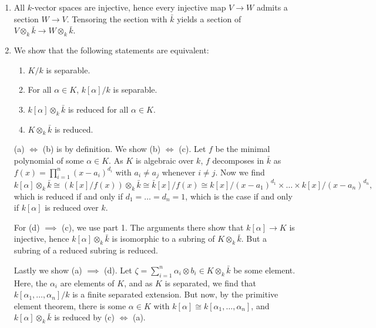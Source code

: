 \documentclass[a4paper,11pt]{article}
\begin{document}
\begin{enumerate}
    \item All $k$-vector spaces are injective, hence every injective map 
        $V \to W$ admits a section $W \to V$. Tensoring the section with 
        $\bar k$ yields a section of $V \otimes_k \bar k \to W \otimes_k \bar k$. 
    \item We show that the following statements are equivalent:
        \begin{enumerate}
            \item $K/k$ is separable.
            \item For all $\alpha \in K$, $k[\alpha]/k$ is separable.
            \item $k[\alpha] \otimes_k \bar k$ is reduced for all $\alpha \in K$.
            \item $K \otimes_k \bar k$ is reduced.
        \end{enumerate}
        (a) $\iff$ (b) is by definition. We show (b) $\iff$ (c). 
        Let $f$ be the minimal polynomial of some $\alpha \in K$. 
        As $K$ is algebraic over $k$, $f$ decomposes in $\bar k$ as 
        $f(x) = \prod_{i = 1}^n (x - a_i)^{d_i}$ with $a_i \neq a_j$ whenever
        $i \neq j$. Now we find 
        \begin{equation*}
            k[\alpha] \otimes_k \bar k \cong (k[x]/f(x)) \otimes_k \bar k
            \cong \bar k[x]/f(x) \cong k[x]/(x-a_1)^{d_1} \times \dots \times k[x] /
            (x-a_n)^{d_n},
        \end{equation*}
        which is reduced if and only if $d_1 = \dots = d_n = 1$, which is 
        the case if and only if $k[\alpha]$ is reduced over $k$.

        For (d) $\implies$ (c), we use part 1. The arguments there show that 
        $k[\alpha] \to K$ is injective, hence $k[\alpha] \otimes_k \bar k$ is
        isomorphic to a subring of $K \otimes_k \bar k$. But a subring of a
        reduced subring is reduced.

        Lastly we show (a) $\implies$ (d). Let $\zeta = \sum_{i=1}^n \alpha_i \otimes
        b_i \in K \otimes_k \bar k$ be some element. Here, the $\alpha_i$ 
        are elements of $K$, and as $K$ is separated, we find that 
        $k[\alpha_1, \dots, \alpha_n]/k$ is a finite separated extension. But
        now, by the primitive element theorem, there is some $\alpha \in K$
        with $k[\alpha] \cong k[\alpha_1, \dots, \alpha_n]$, and
        $k[\alpha] \otimes_k \bar k$ is reduced by (c) $\iff$ (a).
\end{enumerate}
\end{document}
